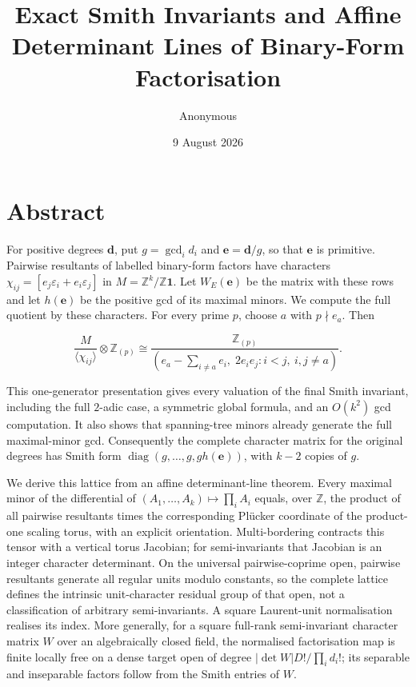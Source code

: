 \documentclass[
  11pt,
  a4paper,
]{article}
\title{Exact Smith Invariants and Affine Determinant Lines of
Binary-Form Factorisation}
\author{Anonymous}
\date{9 August 2026}
\begin{document}
\maketitle

\section{Abstract}\label{abstract}

For positive degrees \(\mathbf d\), put \(g=\gcd_i d_i\) and
\(\mathbf e=\mathbf d/g\), so that \(\mathbf e\) is primitive. Pairwise
resultants of labelled binary-form factors have characters
\(\chi_{ij}=[e_j\varepsilon_i+e_i\varepsilon_j]\) in
\(M=\mathbb Z^k/\mathbb Z\mathbf1\). Let \(W_E(\mathbf e)\) be the
matrix with these rows and let \(h(\mathbf e)\) be the positive gcd of
its maximal minors. We compute the full quotient by these characters.
For every prime \(p\), choose \(a\) with \(p\nmid e_a\). Then

\[
 \frac{M}{\langle\chi_{ij}\rangle}\otimes\mathbb Z_{(p)}
 \cong
 \frac{\mathbb Z_{(p)}}{
 (e_a-\sum_{i\ne a}e_i,\;2e_ie_j:i<j,\ i,j\ne a)}.
\]

This one-generator presentation gives every valuation of the final Smith
invariant, including the full \(2\)-adic case, a symmetric global
formula, and an \(O(k^2)\) gcd computation. It also shows that
spanning-tree minors already generate the full maximal-minor gcd.
Consequently the complete character matrix for the original degrees has
Smith form \(\operatorname{diag}(g,\ldots,g,g h(\mathbf e))\), with
\(k-2\) copies of \(g\).

We derive this lattice from an affine determinant-line theorem. Every
maximal minor of the differential of
\((A_1,\ldots,A_k)\mapsto\prod_iA_i\) equals, over \(\mathbb Z\), the
product of all pairwise resultants times the corresponding Plücker
coordinate of the product-one scaling torus, with an explicit
orientation. Multi-bordering contracts this tensor with a vertical torus
Jacobian; for semi-invariants that Jacobian is an integer character
determinant. On the universal pairwise-coprime open, pairwise resultants
generate all regular units modulo constants, so the complete lattice
defines the intrinsic unit-character residual group of that open, not a
classification of arbitrary semi-invariants. A square Laurent-unit
normalisation realises its index. More generally, for a square full-rank
semi-invariant character matrix \(W\) over an algebraically closed
field, the normalised factorisation map is finite locally free on a
dense target open of degree \(|\det W|D!/\prod_i d_i!\); its separable
and inseparable factors follow from the Smith entries of \(W\).
\end{document}
